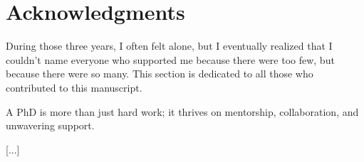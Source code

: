 \chapter*{Acknowledgments}
%




During those three years, I often felt alone, but I eventually realized that I couldn't name everyone who supported me because there were too few, but because there were so many.
This section is dedicated to all those who contributed to this manuscript.

A PhD is more than just hard work; it thrives on mentorship, collaboration, and unwavering support.

[...]